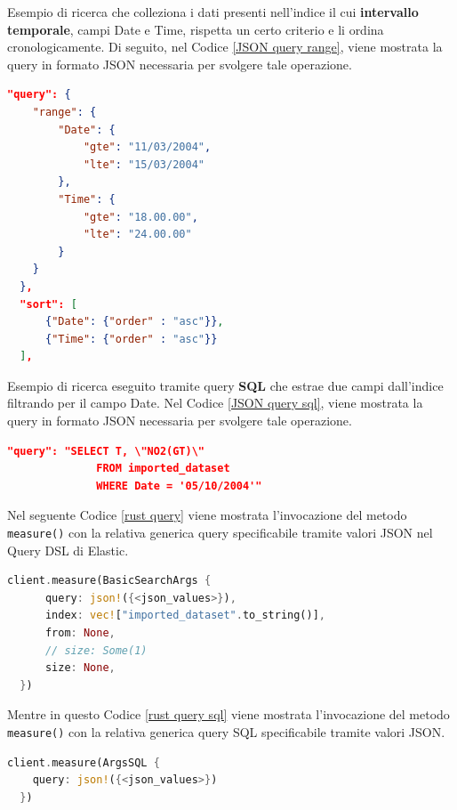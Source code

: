 \begin{exmp}
	Esempio di ricerca che colleziona i dati presenti nell'indice il cui \textbf{intervallo temporale}, campi Date e Time, rispetta un certo criterio e li ordina cronologicamente. Di seguito, nel Codice \ref{JSON query range}, viene mostrata la query in formato JSON necessaria per svolgere tale operazione.

	\begin{lstlisting}[language=json, caption= Valori JSON per query \emph{range} su intervalli temporali \label{JSON query range}, basicstyle=\ttfamily]
  "query": {
    "range": {
        "Date": {
            "gte": "11/03/2004",
            "lte": "15/03/2004"
        },
        "Time": {
            "gte": "18.00.00",
            "lte": "24.00.00"
        }
    }
  },
  "sort": [
      {"Date": {"order" : "asc"}},
      {"Time": {"order" : "asc"}}
  ],
  \end{lstlisting}
\end{exmp}

\begin{exmp}
	Esempio di ricerca eseguito tramite query \textbf{SQL} che estrae due campi dall'indice filtrando per il campo Date. Nel Codice \ref{JSON query sql}, viene mostrata la query in formato JSON necessaria per svolgere tale operazione.

	\begin{lstlisting}[language=json, caption= Valori JSON per query \emph{SQL} \label{JSON query sql}, basicstyle=\ttfamily]
    "query": "SELECT T, \"NO2(GT)\"
              FROM imported_dataset
              WHERE Date = '05/10/2004'"
  \end{lstlisting}
\end{exmp}


\begin{exmp}
	Nel seguente Codice \ref{rust query} viene mostrata l'invocazione del metodo \texttt{measure()} con la relativa generica query specificabile tramite valori JSON nel Query \gls{DSL} di Elastic.

	\begin{lstlisting}[language=rust, caption= Esecuzione Rust della query nel linguaggio di Elastic\label{rust query}, basicstyle=\ttfamily]
  client.measure(BasicSearchArgs {
      query: json!({<json_values>}),
      index: vec!["imported_dataset".to_string()],
      from: None,
      // size: Some(1)
      size: None,
  })
  \end{lstlisting}

	Mentre in questo Codice \ref{rust query sql} viene mostrata l'invocazione del metodo \texttt{measure()} con la relativa generica query SQL specificabile tramite valori JSON.
	\begin{lstlisting}[language=rust, caption= Esecuzione Rust della query SQL \label{rust query sql}, basicstyle=\ttfamily]
  client.measure(ArgsSQL {
    query: json!({<json_values>})
  })
  \end{lstlisting}
\end{exmp}

